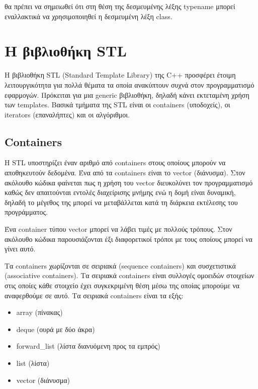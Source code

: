 θα πρέπει να σημειωθεί ότι στη θέση της δεσμευμένης λέξης typename μπορεί εναλλακτικά να χρησιμοποιηθεί η δεσμευμένη λέξη class.

\section{Η βιβλιοθήκη STL}
Η βιβλιοθήκη STL (Standard Template Library) της C++ προσφέρει έτοιμη λειτουργικότητα για πολλά θέματα τα οποία ανακύπτουν συχνά στον προγραμματισμό εφαρμογών. Πρόκειται για μια generic βιβλιοθήκη, δηλαδή κάνει εκτεταμένη χρήση των templates. Βασικά τμήματα της STL είναι οι containers (υποδοχείς), οι iterators (επαναλήπτες) και οι αλγόριθμοι.

\subsection{Containers}
H STL υποστηρίζει έναν αριθμό από containers στους οποίους μπορούν να αποθηκευτούν δεδομένα. Ένα από τα containers είναι το vector (διάνυσμα). Στον ακόλουθο κώδικα φαίνεται πως η χρήση του vector διευκολύνει τον προγραμματισμό καθώς δεν απαιτούνται εντολές διαχείρισης μνήμης ενώ η δομή είναι δυναμική, δηλαδή το μέγεθος της μπορεί να μεταβάλλεται κατά τη διάρκεια εκτέλεσης του προγράμματος. 





Ένα container τύπου vector μπορεί να λάβει τιμές με πολλούς τρόπους. Στον ακόλουθο κώδικα παρουσιάζονται έξι διαφορετικοί τρόποι με τους οποίους μπορεί να γίνει αυτό.




Τα containers χωρίζονται σε σειριακά (sequence containers) και συσχετιστικά (associative containers). Τα σειριακά containers είναι συλλογές ομοειδών στοιχείων στις οποίες κάθε στοιχείο  έχει συγκεκριμένη θέση μέσω της οποίας μπορούμε να αναφερθούμε σε αυτό. Τα σειριακά containers είναι τα εξής: 
\begin{itemize}[noitemsep]
\item array (πίνακας) 
\item deque (ουρά με δύο άκρα)
\item forward\_list (λίστα διανυόμενη προς τα εμπρός)
\item list (λίστα)
\item vector (διάνυσμα)
\end{itemize}

